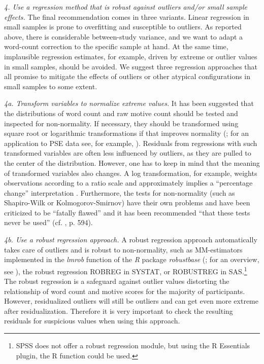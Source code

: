 \documentclass[man,a4paper,mask]{apa6}\usepackage[]{graphicx}\usepackage[]{color}
\begin{document}
\emph{4. Use a regression method that is robust against outliers and/or small sample effects.}
The final recommendation comes in three variants. Linear regression in small samples is prone to overfitting and susceptible to outliers. As reported above, there is considerable between-study variance, and we want to adapt a word-count correction to the specific sample at hand. At the same time, implausible regression estimates, for example, driven by extreme or outlier values in small samples, should be avoided. We suggest three regression approaches that all promise to mitigate the effects of outliers or other atypical configurations in small samples to some extent.

\emph{4a. Transform variables to normalize extreme values.} It has been suggested that the distributions of word count and raw motive count should be tested and inspected for non-normality. If necessary, they should be transformed using square root or logarithmic transformations if that improves normality (; for an application to PSE data see, for example, ). Residuals from regressions with such transformed variables are often less influenced by outliers, as they are pulled to the center of the distribution. However, one has to keep in mind that the meaning of transformed variables also changes. A log transformation, for example, weights observations according to a ratio scale and approximately implies a ``percentage change'' interpretation \parencite{keene_LogTransformationSpecial_1995}. Furthermore, the tests for non-normality (such as Shapiro-Wilk or Kolmogorov-Smirnov) have their own problems and have been criticized to be ``fatally flawed'' and it has been recommended ``that these tests never be used'' (cf. , p. 594).

\emph{4b. Use a robust regression approach.}
A robust regression approach automatically takes care of outliers and is robust to non-normality, such as MM-estimators implemented in the \emph{lmrob} function of the \emph{R} package \emph{robustbase} (; for an overview, see ), the robust regression ROBREG in SYSTAT, or ROBUSTREG in SAS.\footnote{SPSS does not offer a robust regression module, but using the R Essentials plugin, the R function could be used.} The robust regression is a safeguard against outlier values distorting the relationship of word count and motive scores for the majority of participants. However, residualized outliers will still be outliers and can get even more extreme after residualization. Therefore it is very important to check the resulting residuals for suspicious values when using this approach.
\end{document}
